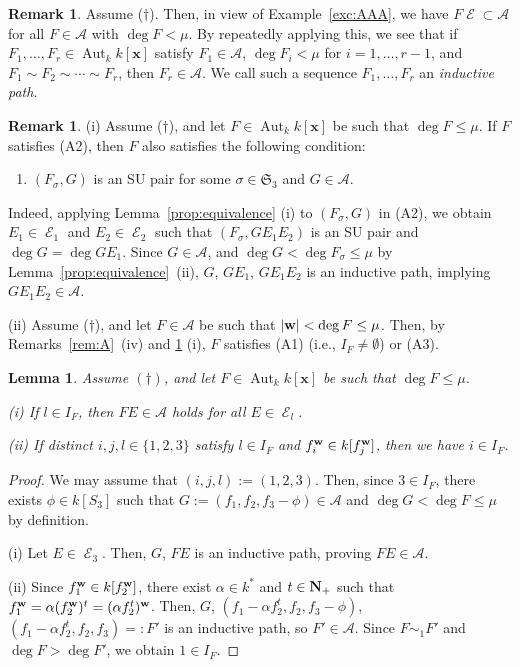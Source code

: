 \documentclass{amsart}
\theoremstyle{plain}
\newtheorem{lem}[thm]{Lemma}
\theoremstyle{definition}
\newtheorem{rem}[thm]{Remark}
\newcommand{\A}{\mathcal{A}}
\newcommand{\E }{{\mathop{\mathcal{E}}\nolimits}}
\renewcommand{\rightsquigarrow }{\mathbin{\sim}}
\newcommand{\Aut }{\mathop{\mathrm{Aut}}\nolimits}
\newcommand{\nd}{\noindent}
\newcommand{\N}{{\bf N}}
\newcommand{\x}{{\boldsymbol x}}
\newcommand{\w}{{\bf w}}
\newcommand{\kx}{k[\x]}
\newcommand{\sym}{\mathfrak{S}}
\begin{document}
\begin{rem}
\label{rem:induction}\rm 
Assume ($\dag $). 
Then, in view of Example~\ref{exc:AAA}, 
we have $F\E \subset \A $ 
for all $F\in \A $ with $\deg F<\mu $. 
By repeatedly applying this, 
we see that 
if $F_1,\ldots ,F_r\in \Aut _k\kx $ satisfy 
$F_1\in \A $, 
$\deg F_i<\mu $ for $i=1,\ldots ,r-1$, 
and $F_1\rightsquigarrow F_2\rightsquigarrow \cdots \rightsquigarrow F_r$, 
then $F_r\in \A $. 
We call such a sequence 
$F_1,\ldots ,F_r$ an {\it inductive path}. 
\end{rem}



\begin{rem}\label{rem:sharpflat}\rm 
(i) 
Assume ($\dag $), 
and let $F\in \Aut _k\kx $ be such that $\deg F\le \mu $. 
If $F$ satisfies (A2), 
then $F$ also satisfies the following condition: 
\begin{enumerate}
\item[\rm (A3)] 
$(F_{\sigma },G)$ is an SU pair 
for some $\sigma \in \sym _3$ and $G\in \A $. 
\end{enumerate}
Indeed, 
applying Lemma~\ref{prop:equivalence} (i) to 
$(F_{\sigma },G)$ in (A2), 
we obtain 
$E_1\in \E _1$ and $E_2\in \E _2$ such that 
$(F_{\sigma },GE_1E_2)$ is an SU pair and $\deg G=\deg GE_1$. 
Since $G\in \A $, 
and $\deg G<\deg F_\sigma \le \mu $ by Lemma~\ref{prop:equivalence}~(ii), 
$G$, $GE_1$, $GE_1E_2$ is an inductive path, 
implying $GE_1E_2\in \A $. 


\nd (ii) 
Assume ($\dag $), 
and let $F\in \A $ be such that $|\w |<\deg F\le \mu $. 
Then, 
by Remarks~\ref{rem:A}~(iv) and \ref{rem:sharpflat} (i), 
$F$ satisfies (A1) (i.e., $I_F\neq \emptyset $) or (A3). 
\end{rem}



\begin{lem}\label{claim:1}
Assume $(\dag )$, 
and let $F\in \Aut _k\kx $ be such that $\deg F\le \mu $. 

\noindent
{\rm (i)} 
If $l\in I_F$, then $FE\in \mathcal{A}$ 
holds for all $E\in \E _l$. 


\noindent
{\rm (ii)} 
If distinct $i,j,l\in \{ 1,2,3\} $ satisfy 
$l\in I_F$ and $f_i^{\w }\in k[f_j^{\w }]$, 
then we have $i\in I_F$. 

\end{lem}



\begin{proof}
We may assume that $(i,j,l):=(1,2,3)$. 
Then, 
since $3\in I_F$, 
there exists $\phi \in k[S_3]$ such that 
$G:=(f_1,f_2,f_3-\phi )\in \A $ 
and $\deg G<\deg F\le \mu $ by definition. 


(i) Let $E\in \E _3$. Then, $G$, $FE$ is an inductive path, 
proving $FE\in \A $.


(ii) Since $f_1^{\w }\in k[f_2^{\w }]$, 
there exist $\alpha \in k^*$ and $t\in \N _+$ such that 
$f_1^{\w }=\alpha (f_2^{\w })^t=(\alpha f_2^t)^{\w }$. 
Then, 
$G$, $(f_1-\alpha f_2^t,f_2,f_3-\phi )$, $(f_1-\alpha f_2^t,f_2,f_3)=:F'$ 
is an inductive path, so $F'\in \A $. 
Since $F\sim _1F'$ and $\deg F>\deg F'$, 
we obtain $1\in I_F$. 
\end{proof}
\end{document}
